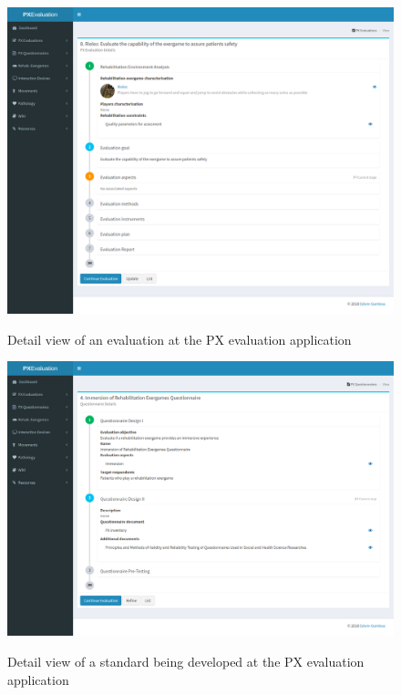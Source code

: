\begin{figure}[bth]
\myfloatalign
{\includegraphics[width=\linewidth]{gfx/app/evaluationApp2}} \quad
\caption{Detail view of an evaluation at the \ac{PX} evaluation application}\label{fig:evaluationApp2}
\end{figure}


\begin{figure}[bth]
\myfloatalign
{\includegraphics[width=\linewidth]{gfx/app/standardApp}} \quad
\caption{Detail view of a standard being developed at the \ac{PX} evaluation application}\label{fig:standardApp}
\end{figure}

